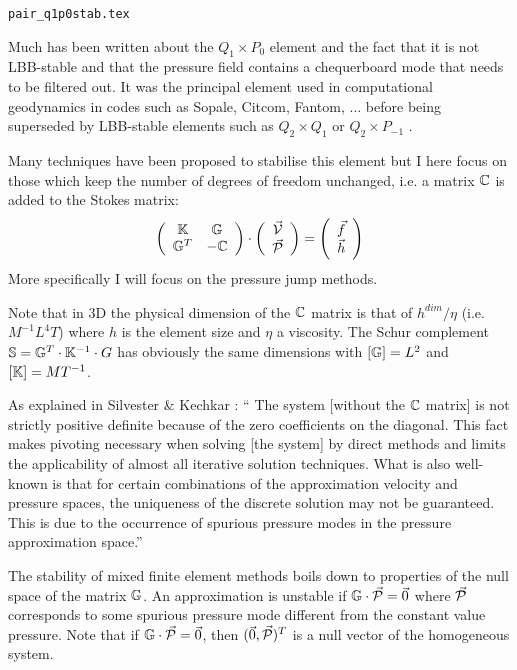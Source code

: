 \begin{flushright} {\tiny {\color{gray} \tt pair\_q1p0stab.tex}} \end{flushright}
Much has been written about the $Q_1\times P_0$ element and the fact that it is not LBB-stable and that the pressure field contains a chequerboard mode that needs to be filtered out. 
It was the principal element used in computational geodynamics in codes such as Sopale, Citcom, Fantom, ... before being 
superseded by LBB-stable elements such as $Q_2\times Q_1$ or $Q_2\times P_{-1}$ \cite{thba22}.

Many techniques have been proposed to stabilise this element but I here focus on those which keep the number of degrees of freedom unchanged, i.e. a matrix ${\mathbb{C}}$ is added to the Stokes matrix:
\[
\left(
\begin{array}{cc}
{\mathbb{K}} & {\mathbb{G}} \\
{\mathbb{G}}^T & -{\mathbb{C}} 
\end{array}
\right)
\cdot
\left(
\begin{array}{c}
\vec{\cal V} \\
\vec{\cal P}
\end{array}
\right)
=
\left(
\begin{array}{c}
\vec{f} \\
\vec{h}
\end{array}
\right)
\]
More specifically I will focus on the pressure jump methods.

Note that in 3D the physical dimension of the ${\mathbb{C}}$ matrix is that of $h^{dim}/\eta$ (i.e. $M^{-1}L^4T$) where $h$ is the element size and $\eta$ a viscosity. The Schur complement ${\mathbb{S}}={\mathbb{G}}^T\cdot {\mathbb{K}}^{-1} \cdot G$ has obviously the same dimensions with $[{\mathbb{G}}]=L^2$ and $[{\mathbb{K}}]=MT^{-1}$.

As explained in Silvester \& Kechkar \cite{sike90}: ``
The system [without the ${\mathbb{C}}$ matrix] is not strictly positive definite because of the zero coefficients on the
diagonal. This fact makes pivoting necessary when solving [the system] by direct methods and limits the applicability of almost all iterative solution techniques. What is also well-known is that for certain combinations of the approximation velocity and pressure spaces, the uniqueness of the discrete solution may not be guaranteed. This is due to the occurrence of spurious pressure modes in the pressure approximation space.''

The stability of mixed finite element methods boils down to properties of the null space of the matrix ${\mathbb{G}}$. 
An approximation is unstable if ${\mathbb{G}} \cdot \vec{\cal P} = \vec{0}$ where $\vec{\cal P}$ corresponds to some spurious pressure mode different from the constant value pressure. Note that if ${\mathbb{G}}\cdot \vec{\cal P} = \vec{0}$, then $(\vec{0},\vec{\cal P})^T$ is a null vector of  
the homogeneous system. 

